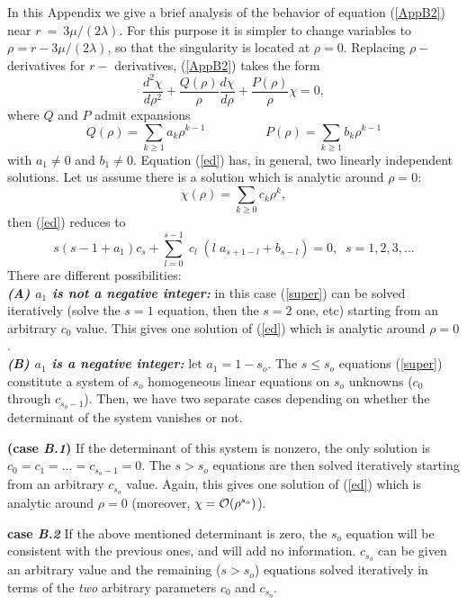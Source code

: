 \documentclass[12pt,aps,floats,showpacs,amssymb,tightenlines]{revtex4}
\begin{document}
In this Appendix we give a brief analysis of the behavior of
equation (\ref{AppB2}) near $r~=~3\mu/(2 \lambda)$. For this purpose
it is simpler to change variables to $\rho=r-3\mu/(2 \lambda)$, so
that the singularity is located at $\rho=0$. Replacing $\rho-$
derivatives for $r-$ derivatives, (\ref{AppB2}) takes the form
\begin{equation}\label{ed}
 \frac {d^2\chi}{d\rho^2} +  \frac {Q(\rho)}{\rho}\frac {d
\chi}{d\rho} +\frac {P(\rho)}{\rho}\chi = 0,
\end{equation}
where $Q$ and $P$ admit expansions
\begin{equation}
Q(\rho) = \sum_{k\geq 1} a_k \rho^{k-1} \hspace{2cm} P(\rho) =
\sum_{k\geq 1} b_k \rho^{k-1}
\end{equation}
with $a_1 \neq 0$ and $b_1 \neq 0$. Equation (\ref{ed}) has, in general,
two linearly independent solutions. Let us assume there is a solution
which is analytic around $\rho=0$:
\begin{equation}
\chi(\rho) = \sum_{k\geq 0} c_k \rho^{k},
\end{equation}
then (\ref{ed}) reduces to
\begin{equation} \label{super}
s \left( s-1 + a_1\right) c_{{s}}+\sum _{l=0}^{s-1} \; c_{{l}} \;
\left( l \; a_{{s+1-l}} +  b_{{s-l}} \right)  = 0 , \;\; s=1,2,3,...
\end{equation}
There are different possibilities:\\
{\bf \em (A) $a_1$ is not a negative integer:} in this case
(\ref{super}) can be solved iteratively (solve the $s=1$ equation,
then the $s=2$ one, etc) starting from an arbitrary $c_0$ value.
This gives one solution
of (\ref{ed}) which is analytic around $\rho=0$.\\
{\bf \em (B) $a_1$ is  a negative integer:} let $a_1=1-s_o$. The $s
\leq s_o$ equations (\ref{super}) constitute a system of $s_o$
homogeneous linear equations on $s_o$ unknowns ($c_0$ through
$c_{s_o-1}$). Then, we have two separate cases depending on whether
the determinant of the system vanishes or not.

  {\bf (case {\em B.1})} If the determinant of
this system is nonzero, the only solution
 is $c_0=c_1=\dots=c_{s_o-1}=0$. The $s
> s_o$ equations are then solved iteratively starting from an
arbitrary $c_{s_o}$ value. Again, this gives one solution of
(\ref{ed}) which is analytic around $\rho=0$ (moreover, $\chi =
{\cal O} (\rho^{s_o})$).

{\bf case {\em B.2}} If the
above mentioned determinant is zero, the $s_o$ equation will be
consistent with the previous ones, and will add no information.
$c_{s_o}$ can be given an arbitrary value and the remaining ($s
> s_o$) equations solved iteratively in terms of the {\em two}
arbitrary parameters $c_0$ and $c_{s_o}$.\\
\end{document}
